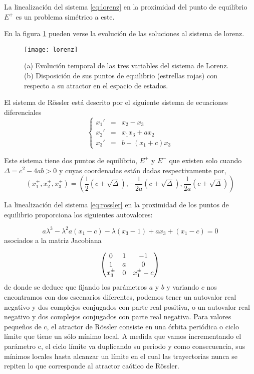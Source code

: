 La linealización del sistema \ref{eq:lorenz} en la proximidad del punto de equilibrio $E^+$ es un problema simétrico a este.

En la figura \ref{fig:lorenz} pueden verse la evolución de las soluciones al sistema de lorenz.
%
\begin{figure}
\centering\texttt{[image: lorenz]}
\caption{(a) Evolución temporal de las tres variables del sistema de Lorenz.(b) Disposición de sus puntos de equilibrio (estrellas rojas) con respecto a su atractor en el espacio de estados.}
\label{fig:lorenz}
\end{figure}

El sistema de Rössler está descrito por el siguiente sistema de ecuaciones diferenciales
\begin{equation}\label{eq:rossler}
\left \{
\begin{array}{rcl}
x_1' &=& x_2-x_3\\
x_2' &=& x_1x_3+ax_2\\
x_3' &=& b+(x_1+c)x_3
\end{array}
\right.
\end{equation}

Este sistema tiene dos puntos de equilibrio, $E^+$ y $E^-$ que existen solo cuando $\Delta=c^2-4ab>0$ y cuyas coordenadas están dadas respectivamente por,
\begin{equation}
(x_1^\pm,x_2^\pm,x_3^\pm)=\left( \frac{1}{2} (c \pm \sqrt{\Delta}),-\frac{1}{2a} (c \pm \sqrt{\Delta}),\frac{1}{2a} (c \pm \sqrt{\Delta})\right) \nonumber
\end{equation}
 
La linealización del sistema \ref{eq:rossler} en la proximidad de los puntos de equilibrio proporciona los siguientes autovalores:

\begin{equation}
a \lambda^3 - \lambda^2 a (x_1-c)-\lambda(x_3-1)+ax_3+(x_1-c)=0 \nonumber
\end{equation}
 asociados a la matriz Jacobiana
 
\begin{equation}
\begin{pmatrix}
0 &\-1 &-1 \\
1 &a &0 \\
x_3^\pm &0 &x_1^\pm-c
\end{pmatrix}
\nonumber
\end{equation}
de donde se deduce que fijando los parámetros $a$ y $b$ y variando $c$ nos encontramos con dos escenarios diferentes, podemos tener un autovalor real negativo y dos complejos conjugados con parte real positiva, o un autovalor real negativo y dos complejos conjugados con parte real negativa.
Para valores pequeños de c, el atractor de Rössler consiste en una órbita periódica o ciclo límite que tiene un sólo mínimo local.
A medida que vamos incrementando el parámetro c, el ciclo límite va duplicando su periodo y como consecuencia, sus mínimos locales hasta alcanzar un límite en el cual las trayectorias nunca se repiten lo que corresponde al atractor caótico de Rössler. 

